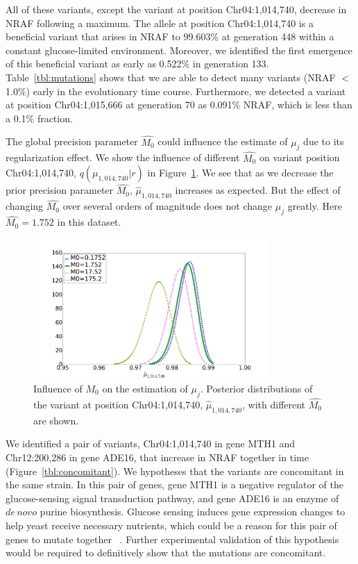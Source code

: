 \documentclass[11pt,reqno]{amsart}
\begin{document}
All of these variants, except the variant at position Chr04:1,014,740, decrease in NRAF following a maximum.
The allele at position Chr04:1,014,740 is a beneficial variant that arises in NRAF to 99.603\% at generation 448 within a constant glucose-limited environment.
Moreover, we identified the first emergence of this beneficial variant as early as 0.522\% in generation 133.
Table~\ref{tbl:mutations} shows that we are able to detect many variants (NRAF $<$ 1.0\%) early in the evolutionary time course.
Furthermore, we detected a variant at position Chr04:1,015,666 at generation 70 as 0.091\% NRAF, which is less than a 0.1\% fraction.


The global precision parameter $\hat{M_0}$ could influence the estimate of $\mu_j$ due to its regularization effect.
We show the influence of different $\hat{M_0}$ on variant position Chr04:1,014,740, $q(\mu_{1,014,740}|r)$ in Figure~\ref{tbl:M0}.
We see that as we decrease the prior precision parameter $\hat{M_0}$, $\hat{\mu}_{1,014,740}$ increases as expected.
But the effect of changing $\hat{M_0}$ over several orders of magnitude does not change $\mu_j$ greatly.
Here $\hat{M_0} = 1.752$ in this dataset.
\begin{figure}[htbp]
\centering
\includegraphics[width=0.8\textwidth]{figs/diff_M0.png}
\caption{Influence of $M_0$ on the estimation of $\mu_j$.
Posterior distributions of the variant at position Chr04:1,014,740, $\hat{\mu}_{1,014,740}$, with different $\hat{M_0}$ are shown.}
\label{tbl:M0}
\end{figure}

We identified a pair of variants, Chr04:1,014,740 in gene MTH1 and Chr12:200,286 in gene ADE16, that increase in NRAF together in time (Figure~\ref{tbl:concomitant}).
We hypotheses that the variants are concomitant in the same strain.
In this pair of genes, gene MTH1 is a negative regulator of the glucose-sensing signal transduction pathway, and gene ADE16 is an enzyme of $\mathit{de\, novo}$ purine biosynthesis.
Glucose sensing induces gene expression changes to help yeast receive necessary nutrients, which could be a reason for this pair of genes to mutate together ~\citep{johnston1999feasting}.
Further experimental validation of this hypothesis would be required to definitively show that the mutations are concomitant.
\end{document}
